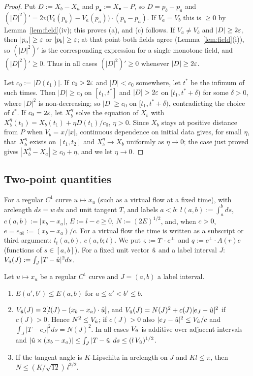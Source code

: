 \begin{proof}
Put $D:=X_b-X_a$ and $p_\bullet:=X_\bullet-P$, so $D=p_b-p_a$ and $(|D|^2)'=2v\bigl(V_b(p_b)-V_a(p_a)\bigr)\cdot(p_b-p_a)$. If
$V_a=V_b$ this is $\ge0$ by Lemma~\ref{lem:field}(iv); this proves (a), and (c) follows. If $V_a\ne V_b$ and $|D|\ge2\varepsilon$, then
$|p_a|\ge\varepsilon$ or $|p_b|\ge\varepsilon$; at that point both fields agree (Lemma~\ref{lem:field}(i)), so $(|D|^2)'$ is the corresponding
expression for a single monotone field, and $(|D|^2)'\ge0$. Thus in all cases $(|D|^2)'\ge0$ whenever $|D|\ge2\varepsilon$.

Let $c_0:=|D(t_1)|$. If $c_0>2\varepsilon$ and $|D|<c_0$ somewhere, let $t^*$ be the infimum of such times. Then $|D|\ge c_0$ on
$[t_1,t^*]$ and $|D|>2\eps$ on $[t_1,t^*+\delta)$ for some $\delta>0$, where $|D|^2$ is non-decreasing; so $|D|\ge c_0$ on
$[t_1,t^*+\delta)$, contradicting the choice of $t^*$. If $c_0=2\varepsilon$, let $X_b^\eta$ solve the equation of $X_b$ with
$X_b^\eta(t_1)=X_b(t_1)+\eta D(t_1)/c_0$, $\eta>0$. Since $X_b$ stays at positive distance from $P$ when $V_b=x/|x|$, continuous
dependence on initial data gives, for small $\eta$, that $X_b^\eta$ exists on $[t_1,t_2]$ and $X_b^\eta\to X_b$ uniformly as
$\eta\to0$; the case just proved gives $|X_b^\eta-X_a|\ge c_0+\eta$, and we let $\eta\to0$.
\end{proof}

\subsection{Two-point quantities}

\begin{definition}\label{def:excess}
For a regular $C^1$ curve $u\mapsto x_u$ (such as a virtual flow at a fixed time), with arclength $ds=w\,du$ and unit tangent $T$,
and labels $a<b$: $l(a,b):=\int_a^bds$, $c(a,b):=|x_b-x_a|$, $E:=l-c\ge0$, $N:=(2E)^{1/2}$, and, when $c>0$,
$e=e_{ab}:=(x_b-x_a)/c$. For a virtual flow the time is written as a subscript or third argument: $l_t(a,b)$, $c(a,b;t)$. We put
$\varsigma:=T\cdot e^\perp$ and $q:=e^\perp\cdot A(r)e$ \textup(functions of $s\in[a,b]$\textup). For a fixed unit vector $\hat u$ and a
label interval $J$: $V_{\hat u}(J):=\int_J|T-\hat u|^2ds$.
\end{definition}

\begin{lemma}\label{lem:static}
Let $u\mapsto x_u$ be a regular $C^1$ curve and $J=(a,b)$ a label interval.
\begin{enumerate}
\item[(a)] $E(a',b')\le E(a,b)$ for $a\le a'<b'\le b$.
\item[(b)] $V_{\hat u}(J)=2[l(J)-(x_b-x_a)\cdot\hat u]$, and $V_{\hat u}(J)=N(J)^2+c(J)|e_J-\hat u|^2$ if $c(J)>0$. Hence $N^2\le V_{\hat u}$; if $c(J)>0$ also $|e_J-\hat u|^2\le V_{\hat u}/c$ and
$\int_J|T-e_J|^2ds=N(J)^2$. In all cases $V_{\hat u}$ is additive over adjacent intervals and
$|\hat u\times(x_b-x_a)|\le\int_J|T-\hat u|\,ds\le(l\,V_{\hat u})^{1/2}$.
\item[(c)] If the tangent angle is $K$-Lipschitz in arclength on $J$ and $Kl\le\pi$, then $N\le(K/\sqrt{12})\,l^{3/2}$.
\end{enumerate}
\end{lemma}

